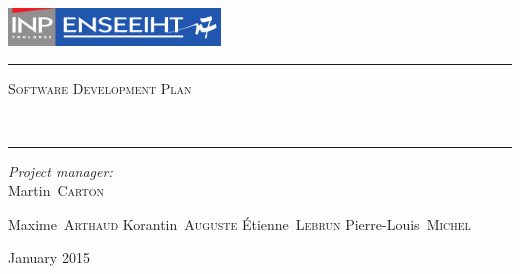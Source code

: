 \begin{titlepage}
  \begin{center}
    \includegraphics[height=1cm]{LogoEnseeiht}\\\vspace{1cm}
    \hrule\vspace{0.5cm}
    \textsc{\Large Software Development Plan}
    \\\vspace{0.5cm}

    \textbf{\huge\thetitle}
    \\\vspace{0.4cm}
    \hrule\vspace{2cm}

    \begin{minipage}{0.4\textwidth}
      \begin{flushleft} \large
        \emph{Project manager:}\\\hspace{1cm}Martin~\textsc{Carton}
      \end{flushleft}
    \end{minipage}
    \begin{minipage}{0.4\textwidth}
      \begin{flushright} \large
          Maxime~\textsc{Arthaud}
          Korantin~\textsc{Auguste}
          Étienne~\textsc{Lebrun}
          Pierre-Louis~\textsc{Michel}
      \end{flushright}
    \end{minipage}

    \vfill
    {\large January 2015}
  \end{center}
\end{titlepage}
